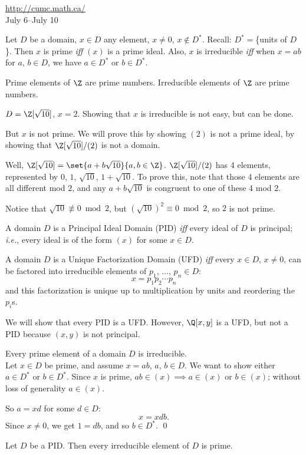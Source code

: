 \url{http://cumc.math.ca/} \\
July 6--July 10

 Let $D$ be a domain, $x\in D$ any element, $x\neq0$, $x\notin D^*$.  Recall: $D^*={}$\{units of $D$\}.  Then $x$ is prime \emph{iff} $(x)$ is a prime ideal.  Also, $x$ is irreducible \emph{iff} when $x=ab$ for $a$, $b\in D$, we have $a\in D^*$ or $b\in D^*$.

\eg Prime elements of $\Z$ are prime numbers.  Irreducible elements of $\Z$ are prime numbers.

\eg $D=\Z[\sqrt{10}]$, $x=2$.  Showing that $x$ is irreducible is not easy, but can be done. \par
But $x$ is not prime.  We will prove this by showing $(2)$ is not a prime ideal, by showing that $\Z[\sqrt{10}]/(2)$ is not a domain. \par
Well, $\Z[\sqrt{10}]=\set{a+b\sqrt{10}}{a,b\in\Z}$.  $\Z[\sqrt{10}]/(2)$ has 4 elements, represented by $0$, $1$, $\sqrt{10}$, $1+\sqrt{10}$.  To prove this, note that those 4 elements are all different mod $2$, and any $a+b\sqrt{10}$ is congruent to one of these 4 mod $2$. \par
Notice that $\sqrt{10}\not\equiv0\bmod2$, but $(\sqrt{10})^2\equiv0\bmod2$, so $2$ is not prime.

 A domain $D$ is a Principal Ideal Domain (PID) \emph{iff} every ideal of $D$ is principal; \emph{i.e.}, every ideal is of the form $(x)$ for some $x\in D$.

 A domain $D$ is a Unique Factorization Domain (UFD) \emph{iff} every $x\in D$, $x\neq0$, can be factored into irreducible elements of $p_1$, $\dotsc$, $p_n\in D$:
\[ x = p_1 p_2 \dotsm p_n \]
and this factorization is unique up to multiplication by units and reordering the $p_i$s.

We will show that every PID is a UFD.  However, $\Q[x,y]$ is a UFD, but not a PID because $(x,y)$ is not principal.

\thm Every prime element of a domain $D$ is irreducible. \\
\pf Let $x\in D$ be prime, and assume $x=ab$, $a$, $b\in D$.  We want to show either $a\in D^*$ or $b\in D^*$.  Since $x$ is prime, $ab\in(x)\implies a\in(x)$ or $b\in(x)$; without loss of generality $a\in(x)$.

So $a=xd$ for some $d\in D$:
\[ x = xdb . \]
Since $x\neq0$, we get $1=db$, and so $b\in D^*$. \qed

\thm Let $D$ be a PID.  Then every irreducible element of $D$ is prime.

